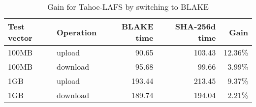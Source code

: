 \begin{table}
  \centering
  \begin{tabular}{ | l | l | r | r | r |}
    \hline
    \textbf{Test vector} & \textbf{Operation} & \textbf{BLAKE time} & \textbf{SHA-256d time} & \textbf{Gain} \\ \hline
    100MB  &  upload    &  90.65   &  103.43 &  12.36\% \\  \hline %
    100MB  &  download  &  95.68   &  99.66  &  3.99\%  \\  \hline %
    1GB    &  upload    &  193.44  &  213.45 &  9.37\%  \\  \hline %
    1GB    &  download  &  189.74  &  194.04 &  2.21\%  \\  \hline %
  \end{tabular}
  \caption{Gain for Tahoe-LAFS by switching to BLAKE}
  \label{tbl:tahoe:gain}
\end{table}
